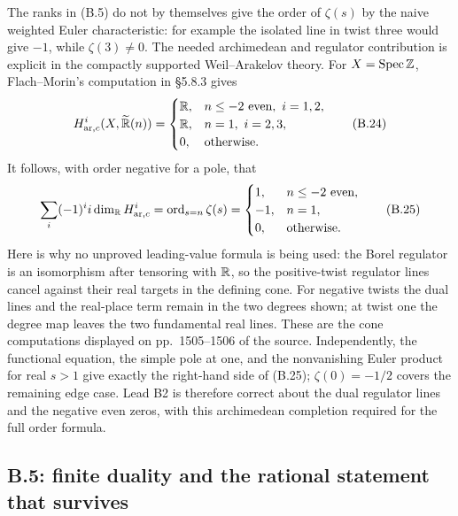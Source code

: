 The ranks in (B.5) do not by themselves give the order of
\(\zeta(s)\) by the naive weighted Euler characteristic: for
example the isolated line in twist three would give \(-1\), while
\(\zeta(3)\ne0\).  The needed archimedean and regulator contribution
is explicit in the compactly supported Weil--Arakelov theory.  For
\(X=\operatorname{Spec}\mathbb Z\), Flach--Morin's computation in \S5.8.3 gives
\[
 H^i_{{\rm ar},c}(X,\widetilde{\mathbb R}(n))=
 \begin{cases}
 \mathbb R,&n\le-2\text{ even},\ i=1,2,\\
 \mathbb R,&n=1,\ i=2,3,\\
 0,&\text{otherwise}.
 \end{cases}\tag{B.24}
\]
It follows, with order negative for a pole, that
\[
\sum_i(-1)^i i\dim_\mathbb R H^i_{{\rm ar},c}
=\operatorname{ord}_{s=n}\zeta(s)
=\begin{cases}1,&n\le-2\text{ even},\\-1,&n=1,\\0,&\text{otherwise}.
\end{cases}\tag{B.25}
\]
Here is why no unproved leading-value formula is being used: the
Borel regulator is an isomorphism after tensoring with \(\mathbb R\),
so the positive-twist regulator lines cancel against their real
targets in the defining cone.  For negative twists the dual lines
and the real-place term remain in the two degrees shown; at twist
one the degree map leaves the two fundamental real lines.  These
are the cone computations displayed on pp.~1505--1506 of the
source.  Independently, the functional equation, the simple pole at
one, and the nonvanishing Euler product for real \(s>1\) give
exactly the right-hand side of (B.25); \(\zeta(0)=-1/2\) covers
the remaining edge case.  Lead B2 is therefore correct about the
dual regulator lines and the negative even zeros, with this
archimedean completion required for the full order formula.

\subsection{B.5: finite duality and the rational statement that survives}

